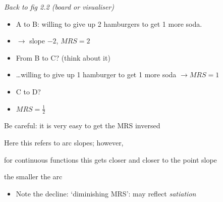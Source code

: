 \documentclass[table]{beamer}
\providecommand{\tightlist}{%
  \setlength{\itemsep}{0pt}\setlength{\parskip}{0pt}}
\begin{document}
\begin{frame}

\emph{Back to fig 2.2 (board or visualiser)}

\begin{itemize}[<+->]
\tightlist
\item
  A to B: willing to give up 2 hamburgers to get 1 more soda.
\end{itemize}

\begin{itemize}[<+->]
\tightlist
\item
  \(\rightarrow\) slope \(-2\), \(MRS=2\)
\end{itemize}

\begin{itemize}[<+->]
\tightlist
\item
  From B to C? (think about it)
\end{itemize}

\begin{itemize}[<+->]
\tightlist
\item
  \ldots willing to give up 1 hamburger to get 1 more soda
  \(\rightarrow MRS =1\)
\end{itemize}

\begin{itemize}[<+->]
\tightlist
\item
  C to D?
\end{itemize}

\begin{itemize}[<+->]
\tightlist
\item
  \(MRS = \frac{1}{2}\)
\end{itemize}

Be careful: it is very easy to get the MRS inversed

Here this refers to arc slopes; however,

for continuous functions this gets closer and closer to the point slope

the smaller the arc

\begin{itemize}[<+->]
\tightlist
\item
  Note the decline: `diminishing MRS': may reflect \emph{satiation}
\end{itemize}

\end{frame}
\end{document}

